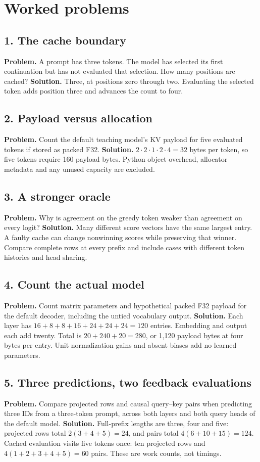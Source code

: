 \section{Worked problems}
\subsection*{1. The cache boundary}
\textbf{Problem.} A prompt has three tokens. The model has selected its
first continuation but has not evaluated that selection. How many positions
are cached?
\textbf{Solution.} Three, at positions zero through two. Evaluating the
selected token adds position three and advances the count to four.
\subsection*{2. Payload versus allocation}
\textbf{Problem.} Count the default teaching model's KV payload for five
evaluated tokens if stored as packed F32.
\textbf{Solution.} $2\cdot2\cdot1\cdot2\cdot4=32$ bytes per token,
so five tokens require 160 payload bytes. Python object overhead,
allocator metadata and any unused capacity are excluded.
\subsection*{3. A stronger oracle}
\textbf{Problem.} Why is agreement on the greedy token weaker than
agreement on every logit?
\textbf{Solution.} Many different score vectors have the same largest
entry. A faulty cache can change nonwinning scores while preserving that
winner. Compare complete rows at every prefix and include cases with
different token histories and head sharing.
\subsection*{4. Count the actual model}
\textbf{Problem.} Count matrix parameters and hypothetical packed F32
payload for the default decoder, including the untied vocabulary output.
\textbf{Solution.} Each layer has $16+8+8+16+24+24+24=120$ entries.
Embedding and output each add twenty. Total is $20+240+20=280$,
or 1,120 payload bytes at four bytes per entry. Unit normalization gains
and absent biases add no learned parameters.
\subsection*{5. Three predictions, two feedback evaluations}
\textbf{Problem.} Compare projected rows and causal query--key pairs when
predicting three IDs from a three-token prompt, across both layers and
both query heads of the default model.
\textbf{Solution.} Full-prefix lengths are three, four and five: projected
rows total $2(3+4+5)=24$, and pairs total $4(6+10+15)=124$.
Cached evaluation visits five tokens once: ten projected rows and
$4(1+2+3+4+5)=60$ pairs. These are work counts, not timings.
